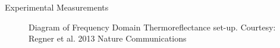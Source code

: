 \documentclass{beamer}
\begin{document}

\begin{frame}{Experimental Measurements}
\begin{figure}[t]
\begin{center}
\vspace*{-0.8cm}
\renewcommand{\figure}{Fig.}
\label{fig:GK_bulk}
\caption{Diagram of Frequency Domain Thermoreflectance set-up. Courtesy: Regner et al. 2013 Nature Communications}
\end{center}
\end{figure}
\end{frame}
\end{document}
